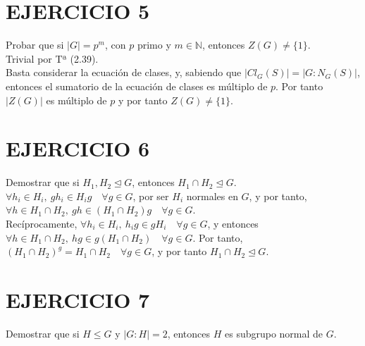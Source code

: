 \documentclass{article}
\begin{document}
\section*{EJERCICIO 5}

Probar que si $|G| = p^m$, con $p$ primo y $m \in \mathbb{N}$, entonces $Z(G) \neq \{1\}$.\\

Trivial por Tª (2.39).\\
Basta considerar la ecuación de clases, y, sabiendo que $|Cl_G(S)| = |G:N_G(S)|$, entonces el sumatorio de la ecuación de clases es múltiplo de $p$. Por tanto $|Z(G)|$ es múltiplo de $p$ y por tanto $Z(G) \neq \{1\}$.\\

\section*{EJERCICIO 6}

Demostrar que si $H_1, H_2 \unlhd G$, entonces $H_1\cap H_2 \unlhd G$.\\

$\forall h_i \in H_i, \ gh_i \in H_ig \quad \forall g \in G$, por ser $H_i$ normales en $G$, y por tanto, $\forall h \in H_1 \cap H_2, \ gh \in (H_1 \cap H_2)g \quad \forall g \in G$.\\
Recíprocamente, $\forall h_i \in H_i, \ h_ig \in gH_i \quad \forall g \in G$, y entonces $\forall h \in H_1 \cap H_2, \ hg \in g(H_1 \cap H_2) \quad \forall g \in G$. Por tanto, $(H_1 \cap H_2)^g = H_1 \cap H_2 \quad \forall g \in G$, y por tanto $ H_1 \cap H_2 \unlhd G$.\\

\section*{EJERCICIO 7}

Demostrar que si $H \leqslant G$ y $|G:H| = 2$, entonces $H$ es subgrupo normal de $G$.\\
\end{document}
